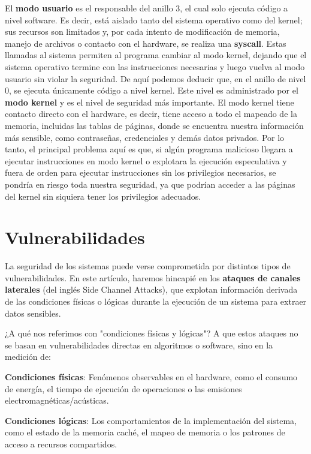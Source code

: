 \documentclass[lettersize,compsoc]{IEEEtran}
\begin{document}
El \textbf{modo usuario} es el responsable del anillo 3, el cual solo ejecuta código a nivel software. Es decir, está aislado tanto del sistema operativo como del kernel; sus recursos son limitados y, por cada intento de modificación de memoria, manejo de archivos o contacto con el hardware, se realiza una \textbf{syscall}. Estas llamadas al sistema permiten al programa cambiar al modo kernel, dejando que el sistema operativo termine con las instrucciones necesarias y luego vuelva al modo usuario sin violar la seguridad.
De aquí podemos deducir que, en el anillo de nivel 0, se ejecuta únicamente código a nivel kernel. Este nivel es administrado por el \textbf{modo kernel} y es el nivel de seguridad más importante. El modo kernel tiene contacto directo con el hardware, es decir, tiene acceso a todo el mapeado de la memoria, incluidas las tablas de páginas, donde se encuentra nuestra información más sensible, como contraseñas, credenciales y demás datos privados.
Por lo tanto, el principal problema aquí es que, si algún programa malicioso llegara a ejecutar instrucciones en modo kernel o explotara la ejecución especulativa y fuera de orden para ejecutar instrucciones sin los privilegios necesarios, se pondría en riesgo toda nuestra seguridad, ya que podrían acceder a las páginas del kernel sin siquiera tener los privilegios adecuados.

\section{Vulnerabilidades}

La seguridad de los sistemas puede verse comprometida por distintos tipos de vulnerabilidades. En este artículo, haremos hincapié en los \textbf{ataques de canales laterales}\cite{Side Channel Attack} (del inglés Side Channel Attacks), que explotan información derivada de las condiciones físicas o lógicas durante la ejecución de un sistema para extraer datos sensibles.

¿A qué nos referimos con "condiciones físicas y lógicas"? A que estos ataques no se basan en vulnerabilidades directas en algoritmos o software, sino en la medición de:

    \textbf{Condiciones físicas}: Fenómenos observables en el hardware, como el consumo de energía, el tiempo de ejecución de operaciones o las emisiones electromagnéticas/acústicas.

    \textbf{Condiciones lógicas}: Los comportamientos de la implementación del sistema, como el estado de la memoria caché, el mapeo de memoria o los patrones de acceso a recursos compartidos.
\end{document}
